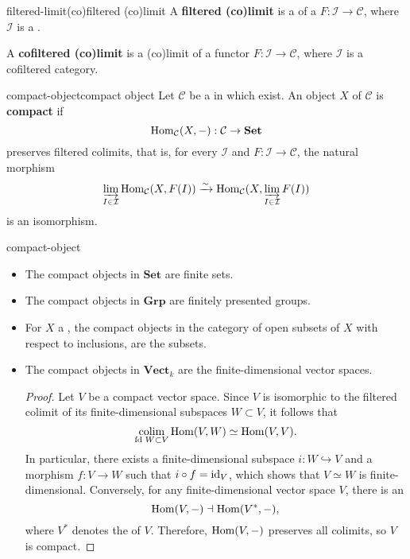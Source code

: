 \begin{topic}{filtered-limit}{(co)filtered (co)limit}
    A \textbf{filtered (co)limit} is a  of a  $F : \mathcal{I} \to \mathcal{C}$, where $\mathcal{I}$ is a .
    
    A \textbf{cofiltered (co)limit} is a (co)limit of a functor $F : \mathcal{I} \to \mathcal{C}$, where $\mathcal{I}$ is a cofiltered category.
\end{topic}

\begin{topic}{compact-object}{compact object}
    Let $\mathcal{C}$ be a   in which  exist. An object $X$ of $\mathcal{C}$ is \textbf{compact} if
    \[ \operatorname{Hom}_\mathcal{C}(X, -) : \mathcal{C} \to \textbf{Set} \]
    preserves filtered colimits, that is, for every  $\mathcal{I}$ and  $F : \mathcal{I} \to \mathcal{C}$, the natural morphism
    \[ \varinjlim_{I \in \mathcal{I}} \operatorname{Hom}_\mathcal{C}(X, F(I)) \xrightarrow{\sim} \operatorname{Hom}_\mathcal{C}(X, \varinjlim_{I \in \mathcal{I}} F(I)) \]
    is an isomorphism.
\end{topic}

\begin{example}{compact-object}
    \begin{itemize}
        \item The compact objects in $\textbf{Set}$ are finite sets.
        \item The compact objects in $\textbf{Grp}$ are finitely presented groups.
        \item For $X$ a , the compact objects in the category of open subsets of $X$ with respect to inclusions, are the  subsets.
        \item The compact objects in $\textbf{Vect}_k$ are the finite-dimensional vector spaces.
        \begin{proof}
            Let $V$ be a compact vector space. Since $V$ is isomorphic to the filtered colimit of its finite-dimensional subspaces $W \subset V$, it follows that
            \[ \underset{\textup{fd } W \subset V}{\operatorname{colim}} \operatorname{Hom}(V, W) \simeq \operatorname{Hom}(V, V) . \]
            In particular, there exists a finite-dimensional subspace $i : W \hookrightarrow V$ and a morphism $f : V \to W$ such that $i \circ f = \textup{id}_V$, which shows that $V \simeq W$ is finite-dimensional. Conversely, for any finite-dimensional vector space $V$, there is an 
            \[ \operatorname{Hom}(V, -) \dashv \operatorname{Hom}(V^*, -) , \]
            where $V^*$ denotes the  of $V$. Therefore, $\operatorname{Hom}(V, - )$ preserves all colimits, so $V$ is compact.
        \end{proof}
    \end{itemize}
\end{example}

